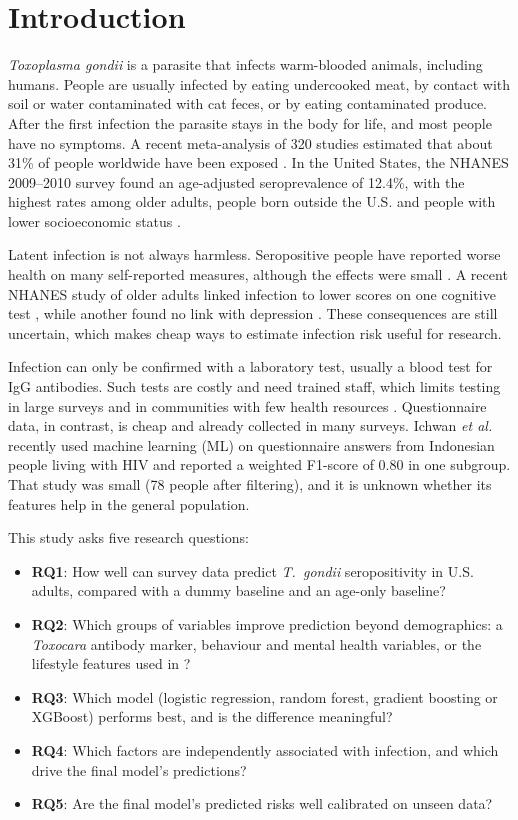\documentclass[conference]{IEEEtran}
\begin{document}
\section{Introduction}

\textit{Toxoplasma gondii} is a parasite that infects warm-blooded animals, including humans. People are usually infected by eating undercooked meat, by contact with soil or water contaminated with cat feces, or by eating contaminated produce. After the first infection the parasite stays in the body for life, and most people have no symptoms. A recent meta-analysis of 320 studies estimated that about 31\% of people worldwide have been exposed \cite{sengupta2025}. In the United States, the NHANES 2009--2010 survey found an age-adjusted seroprevalence of 12.4\%, with the highest rates among older adults, people born outside the U.S. and people with lower socioeconomic status \cite{jones2014}.

Latent infection is not always harmless. Seropositive people have reported worse health on many self-reported measures, although the effects were small \cite{flegr2016}. A recent NHANES study of older adults linked infection to lower scores on one cognitive test \cite{kruszon2023}, while another found no link with depression \cite{gale2021}. These consequences are still uncertain, which makes cheap ways to estimate infection risk useful for research.

Infection can only be confirmed with a laboratory test, usually a blood test for IgG antibodies. Such tests are costly and need trained staff, which limits testing in large surveys and in communities with few health resources \cite{achtziger2025}. Questionnaire data, in contrast, is cheap and already collected in many surveys. Ichwan \textit{et al.} \cite{ichwan} recently used machine learning (ML) on questionnaire answers from Indonesian people living with HIV and reported a weighted F1-score of 0.80 in one subgroup. That study was small (78 people after filtering), and it is unknown whether its features help in the general population.

This study asks five research questions:
\begin{itemize}
\item \textbf{RQ1}: How well can survey data predict \textit{T.~gondii} seropositivity in U.S. adults, compared with a dummy baseline and an age-only baseline?
\item \textbf{RQ2}: Which groups of variables improve prediction beyond demographics: a \textit{Toxocara} antibody marker, behaviour and mental health variables, or the lifestyle features used in \cite{ichwan}?
\item \textbf{RQ3}: Which model (logistic regression, random forest, gradient boosting or XGBoost) performs best, and is the difference meaningful?
\item \textbf{RQ4}: Which factors are independently associated with infection, and which drive the final model's predictions?
\item \textbf{RQ5}: Are the final model's predicted risks well calibrated on unseen data?
\end{itemize}
\end{document}
